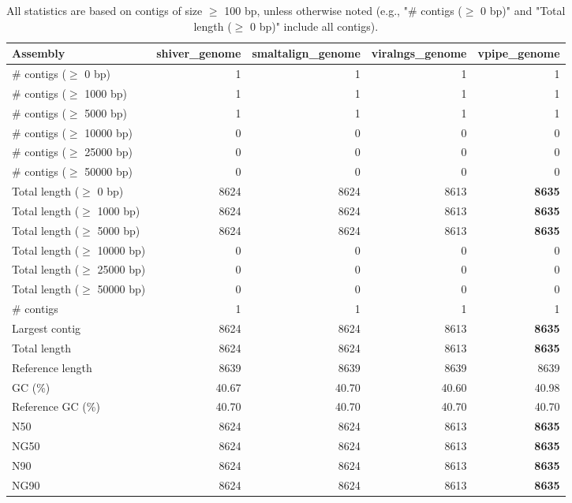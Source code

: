 \documentclass[12pt,a4paper]{article}
\begin{document}
\begin{table}[ht]
\begin{center}
\caption{All statistics are based on contigs of size $\geq$ 100 bp, unless otherwise noted (e.g., "\# contigs ($\geq$ 0 bp)" and "Total length ($\geq$ 0 bp)" include all contigs).}
\begin{tabular}{|l*{4}{|r}|}
\hline
Assembly & shiver\_genome & smaltalign\_genome & viralngs\_genome & vpipe\_genome \\ \hline
\# contigs ($\geq$ 0 bp) & 1 & 1 & 1 & 1 \\ \hline
\# contigs ($\geq$ 1000 bp) & 1 & 1 & 1 & 1 \\ \hline
\# contigs ($\geq$ 5000 bp) & 1 & 1 & 1 & 1 \\ \hline
\# contigs ($\geq$ 10000 bp) & 0 & 0 & 0 & 0 \\ \hline
\# contigs ($\geq$ 25000 bp) & 0 & 0 & 0 & 0 \\ \hline
\# contigs ($\geq$ 50000 bp) & 0 & 0 & 0 & 0 \\ \hline
Total length ($\geq$ 0 bp) & 8624 & 8624 & 8613 & {\bf 8635} \\ \hline
Total length ($\geq$ 1000 bp) & 8624 & 8624 & 8613 & {\bf 8635} \\ \hline
Total length ($\geq$ 5000 bp) & 8624 & 8624 & 8613 & {\bf 8635} \\ \hline
Total length ($\geq$ 10000 bp) & 0 & 0 & 0 & 0 \\ \hline
Total length ($\geq$ 25000 bp) & 0 & 0 & 0 & 0 \\ \hline
Total length ($\geq$ 50000 bp) & 0 & 0 & 0 & 0 \\ \hline
\# contigs & 1 & 1 & 1 & 1 \\ \hline
Largest contig & 8624 & 8624 & 8613 & {\bf 8635} \\ \hline
Total length & 8624 & 8624 & 8613 & {\bf 8635} \\ \hline
Reference length & 8639 & 8639 & 8639 & 8639 \\ \hline
GC (\%) & 40.67 & 40.70 & 40.60 & 40.98 \\ \hline
Reference GC (\%) & 40.70 & 40.70 & 40.70 & 40.70 \\ \hline
N50 & 8624 & 8624 & 8613 & {\bf 8635} \\ \hline
NG50 & 8624 & 8624 & 8613 & {\bf 8635} \\ \hline
N90 & 8624 & 8624 & 8613 & {\bf 8635} \\ \hline
NG90 & 8624 & 8624 & 8613 & {\bf 8635} \\ \hline

\end{tabular}
\end{center}
\end{table}
\end{document}
